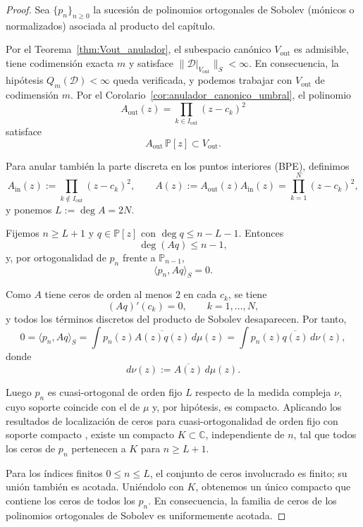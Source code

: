 \documentclass[12pt,a4paper]{article}
\theoremstyle{definition}
\theoremstyle{remark}
\newcommand{\Poly}{\mathbb{P}[z]}
\newcommand{\D}{\mathcal{D}}
\begin{document}
\begin{proof}
  Sea $\{p_n\}_{n\ge0}$ la sucesión de polinomios ortogonales de Sobolev (mónicos o normalizados) asociada al producto del capítulo.

  Por el Teorema~\ref{thm:Vout_anulador}, el subespacio canónico
  \(
  V_{\mathrm{out}}
  \)
  es admisible, tiene codimensión exacta $m$ y satisface $\|\D|_{V_{\mathrm{out}}}\|_S<\infty$. En consecuencia, la hipótesis $Q_m(\D)<\infty$ queda verificada, y podemos trabajar con $V_{\mathrm{out}}$
  de codimensión $m$. Por el Corolario~\ref{cor:anulador_canonico_umbral}, el polinomio
  \[
    A_{\mathrm{out}}(z)=\prod_{k\in I_{\mathrm{out}}}(z-c_k)^2
  \]
  satisface
  \[
    A_{\mathrm{out}}\,\Poly\subset V_{\mathrm{out}}.
  \]

  Para anular también la parte discreta en los puntos interiores (BPE), definimos
  \[
    A_{\mathrm{in}}(z):=\prod_{k\notin I_{\mathrm{out}}}(z-c_k)^2,
    \qquad
    A(z):=A_{\mathrm{out}}(z)A_{\mathrm{in}}(z)=\prod_{k=1}^N (z-c_k)^2,
  \]
  y ponemos $L:=\deg A=2N$.

  Fijemos $n\ge L+1$ y $q\in\Poly$ con $\deg q\le n-L-1$. Entonces
  \[
    \deg(Aq)\le n-1,
  \]
  y, por ortogonalidad de $p_n$ frente a $\mathbb P_{n-1}$,
  \[
    \langle p_n,Aq\rangle_S=0.
  \]

  Como $A$ tiene ceros de orden al menos $2$ en cada $c_k$, se tiene
  \[
    (Aq)'(c_k)=0,
    \qquad k=1,\dots,N,
  \]
  y todos los términos discretos del producto de Sobolev desaparecen. Por tanto,
  \[
    0=\langle p_n,Aq\rangle_S
    =\int p_n(z)\overline{A(z)q(z)}\,d\mu(z)
    =\int p_n(z)\overline{q(z)}\,d\nu(z),
  \]
  donde
  \[
    d\nu(z):=\overline{A(z)}\,d\mu(z).
  \]

  Luego $p_n$ es cuasi-ortogonal de orden fijo $L$ respecto de la medida compleja $\nu$, cuyo soporte coincide con el de $\mu$ y, por hipótesis, es compacto. Aplicando los resultados de localización de ceros para cuasi-ortogonalidad de orden fijo con soporte compacto \cite{lopez1999zero,lopez2001sobolev,marcellan2015sobolev}, existe un compacto $K\subset\mathbb C$, independiente de $n$, tal que todos los ceros de $p_n$ pertenecen a $K$ para $n\ge L+1$.

  Para los índices finitos $0\le n\le L$, el conjunto de ceros involucrado es finito; su unión también es acotada. Uniéndolo con $K$, obtenemos un único compacto que contiene los ceros de todos los $p_n$. En consecuencia, la familia de ceros de los polinomios ortogonales de Sobolev es uniformemente acotada.
\end{proof}
\end{document}
